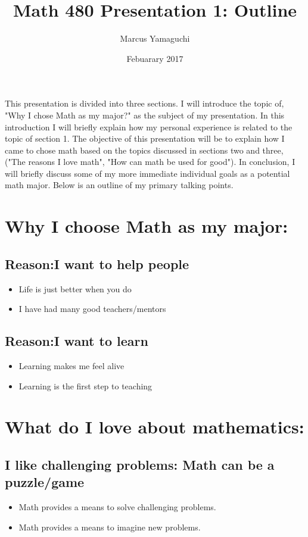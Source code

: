 \documentclass[12pt]{article}
\title{Math 480 Presentation 1: Outline}
\author{Marcus Yamaguchi}
\date{Febuarary 2017}
\begin{document}
	\maketitle
	This presentation is divided into three sections. I will introduce the topic of, "Why I chose Math as my major?" as the subject of my presentation. In this introduction I will briefly explain how my personal experience is related to the topic of section 1. The objective of this presentation will be to explain how I came to chose math based on the topics discussed in sections two and three, ("The reasons I love math", "How can math be used for good"). In conclusion, I will briefly discuss some of my more immediate individual goals as a potential math major. Below is an outline of my primary talking points.\par 
		
	\section{Why I choose Math as my major:}
		\subsection{Reason:I want to help people}
			\begin{itemize}
				\item Life is just better when you do
				\item I have had many good teachers/mentors
			\end{itemize}
		\subsection{Reason:I want to learn}
			\begin{itemize}
				\item Learning makes me feel alive
				\item Learning is the first step to teaching
			\end{itemize}
	\section{What do I love about mathematics:}

		\subsection{I like challenging problems: Math can be a puzzle/game}
			\begin{itemize}
				\item Math provides a means to solve challenging problems.
				\item Math provides a means to imagine new problems. 
			\end{itemize}
\end{document}
